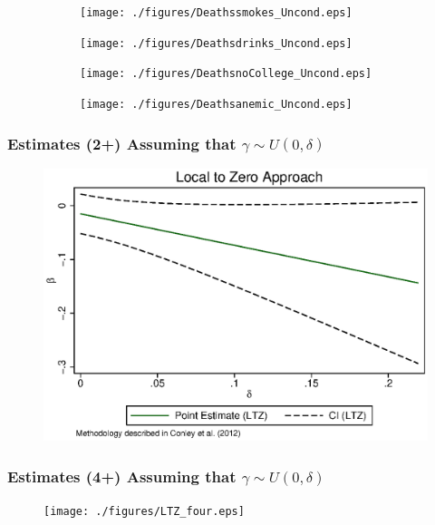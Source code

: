 \documentclass[9pt,letterpaper,subeqn]{beamer}
\begin{document}
\begin{frame}[label=fdgraph]
  \begin{figure}[htpb!]
    \caption{Rates of Miscarriage are higher for twins with unhealthy mothers}
      \begin{subfigure}{.5\textwidth}
      \texttt{[image: ./figures/Deathssmokes\_Uncond.eps]}
    \end{subfigure}%
    \begin{subfigure}{.5\textwidth}
      \texttt{[image: ./figures/Deathsdrinks\_Uncond.eps]}
    \end{subfigure}
    \begin{subfigure}{.5\textwidth}
      \texttt{[image: ./figures/DeathsnoCollege\_Uncond.eps]}
    \end{subfigure}%
    \begin{subfigure}{.5\textwidth}
      \texttt{[image: ./figures/Deathsanemic\_Uncond.eps]}
    \end{subfigure}
    \label{fig:mech}
  \end{figure}
\hyperlink{mech}{}
\end{frame}


\begin{frame}[label=two]
\frametitle{Estimates (2+) Assuming that $\gamma \sim U(0,\delta)$}
\begin{figure}[htpb!]
\centering
  \includegraphics[scale=0.75]{./figures/LTZ_two.eps}
\end{figure}
\hyperlink{Conley}{}
\end{frame}

\begin{frame}[label=four]
\frametitle{Estimates (4+) Assuming that $\gamma \sim U(0,\delta)$}
\begin{figure}[htpb!]
\centering
  \texttt{[image: ./figures/LTZ\_four.eps]}
\end{figure}
\hyperlink{Conley}{}
\end{frame}
\end{document}
